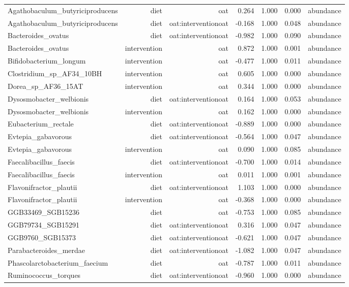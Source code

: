 \documentclass[
]{article}
\begin{document}
\begin{longtable}[t]{lrrrrrr}
Agathobaculum\_butyriciproducens & diet & oat & 0.264 & 1.000 & 0.000 & abundance\\
\addlinespace
Agathobaculum\_butyriciproducens & diet & oat:interventionoat & -0.168 & 1.000 & 0.048 & abundance\\
Bacteroides\_ovatus & diet & oat:interventionoat & -0.982 & 1.000 & 0.090 & abundance\\
Bacteroides\_ovatus & intervention & oat & 0.872 & 1.000 & 0.001 & abundance\\
Bifidobacterium\_longum & intervention & oat & -0.477 & 1.000 & 0.011 & abundance\\
Clostridium\_sp\_AF34\_10BH & intervention & oat & 0.605 & 1.000 & 0.000 & abundance\\
\addlinespace
Dorea\_sp\_AF36\_15AT & intervention & oat & 0.344 & 1.000 & 0.000 & abundance\\
Dysosmobacter\_welbionis & diet & oat:interventionoat & 0.164 & 1.000 & 0.053 & abundance\\
Dysosmobacter\_welbionis & intervention & oat & 0.162 & 1.000 & 0.000 & abundance\\
Eubacterium\_rectale & diet & oat:interventionoat & -0.889 & 1.000 & 0.000 & abundance\\
Evtepia\_gabavorous & diet & oat:interventionoat & -0.564 & 1.000 & 0.047 & abundance\\
\addlinespace
Evtepia\_gabavorous & intervention & oat & 0.090 & 1.000 & 0.085 & abundance\\
Faecalibacillus\_faecis & diet & oat:interventionoat & -0.700 & 1.000 & 0.014 & abundance\\
Faecalibacillus\_faecis & intervention & oat & 0.011 & 1.000 & 0.001 & abundance\\
Flavonifractor\_plautii & diet & oat:interventionoat & 1.103 & 1.000 & 0.000 & abundance\\
Flavonifractor\_plautii & intervention & oat & -0.368 & 1.000 & 0.000 & abundance\\
\addlinespace
GGB33469\_SGB15236 & diet & oat & -0.753 & 1.000 & 0.085 & abundance\\
GGB79734\_SGB15291 & diet & oat:interventionoat & 0.316 & 1.000 & 0.047 & abundance\\
GGB9760\_SGB15373 & diet & oat:interventionoat & -0.621 & 1.000 & 0.047 & abundance\\
Parabacteroides\_merdae & diet & oat:interventionoat & -1.082 & 1.000 & 0.047 & abundance\\
Phascolarctobacterium\_faecium & diet & oat & -0.787 & 1.000 & 0.011 & abundance\\
\addlinespace
Ruminococcus\_torques & diet & oat:interventionoat & -0.960 & 1.000 & 0.000 & abundance\\*
\end{longtable}
\end{document}
